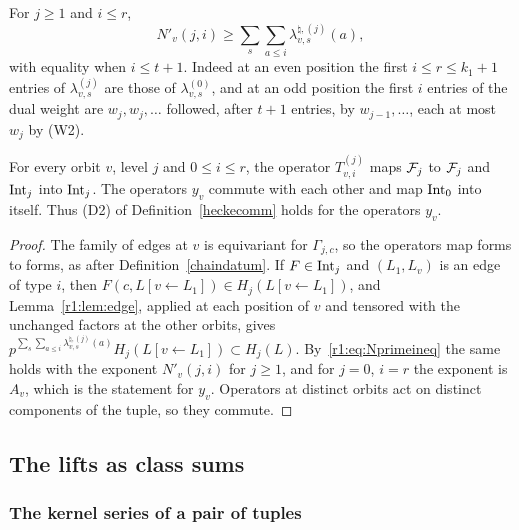 For $j\ge1$ and $i\le r$,
\begin{equation}\label{r1:eq:Nprimeineq}
N'_v(j,i)\ge\sum_s\sum_{a\le i}\lambda^{\natural,(j)}_{v,s}(a),
\end{equation}
with equality when $i\le t+1$. Indeed at an even position the first $i\le r\le k_1+1$ entries of $\lambda^{(j)}_{v,s}$ are those of $\lambda^{(0)}_{v,s}$, and at an odd position the first $i$ entries of the dual weight are $w_j,w_j,\dots$ followed, after $t+1$ entries, by $w_{j-1},\dots$, each at most $w_j$ by (W2).

\begin{lemma}\label{r1:lem:heckeint}
For every orbit $v$, level $j$ and $0\le i\le r$, the operator $T^{(j)}_{v,i}$ maps $\mathcal F_j$ to $\mathcal F_j$ and $\mathrm{Int}_j$ into $\mathrm{Int}_j$. The operators $y_v$ commute with each other and map $\mathrm{Int}_0$ into itself. Thus (D2) of Definition~\ref{heckecomm} holds for the operators $y_v$.
\end{lemma}

\begin{proof}
The family of edges at $v$ is equivariant for $\Gamma_{j,c}$, so the operators map forms to forms, as after Definition~\ref{chaindatum}. If $F\in\mathrm{Int}_j$ and $(L_1,L_v)$ is an edge of type $i$, then $F(c,L[v\leftarrow L_1])\in H_j(L[v\leftarrow L_1])$, and Lemma~\ref{r1:lem:edge}, applied at each position of $v$ and tensored with the unchanged factors at the other orbits, gives $p^{\sum_s\sum_{a\le i}\lambda^{\natural,(j)}_{v,s}(a)}H_j(L[v\leftarrow L_1])\subset H_j(L)$. By~\eqref{r1:eq:Nprimeineq} the same holds with the exponent $N'_v(j,i)$ for $j\ge1$, and for $j=0$, $i=r$ the exponent is $A_v$, which is the statement for $y_v$. Operators at distinct orbits act on distinct components of the tuple, so they commute.
\end{proof}

\subsection{The lifts as class sums}\label{r1:sec:R1lift}

\subsubsection{The kernel series of a pair of tuples}


